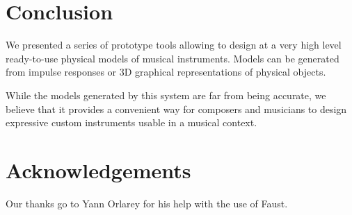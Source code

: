 \documentclass[11pt,a4paper]{article}
\begin{document}
\section{Conclusion}

We presented a series of prototype tools allowing to design at a very high level ready-to-use physical models of musical instruments. Models can be generated from impulse responses or 3D graphical representations of physical objects.

While the models generated by this system are far from being accurate, we believe that it provides a convenient way for composers and musicians to design expressive custom instruments usable in a musical context.


\section{Acknowledgements}

Our thanks go to Yann Orlarey for his help with the use of Faust.



\end{document}
